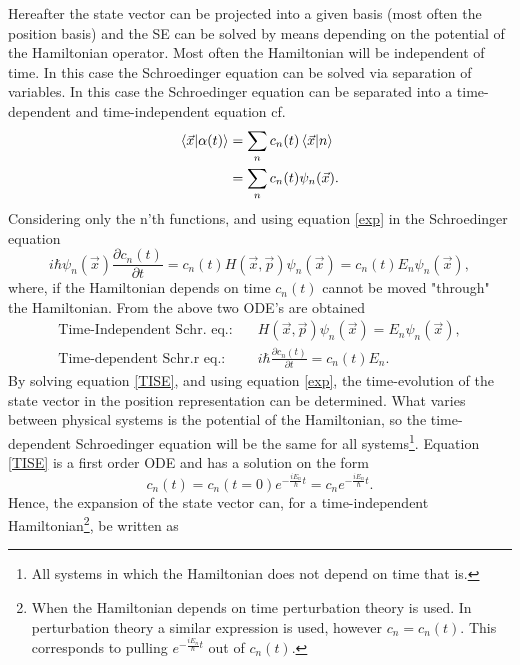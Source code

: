 Hereafter the state vector can be projected into a given basis (most often the position basis) and the SE can be solved by means depending on the potential of the Hamiltonian operator. Most often the Hamiltonian will be independent of time. In this case the Schroedinger equation can be solved via separation of variables. In this case the Schroedinger equation can be separated into a time-dependent and time-independent equation cf.
\begin{equation}
	\begin{split}
		\braket{\vec{x}|\alpha(t)}&=\sum_nc_n(t)\braket{\vec{x}|n}\\
		&=\sum_nc_n(t)\psi_n(\vec{x}).\\
	\end{split}
	\label{exp}
\end{equation} 
Considering only the n'th functions, and using equation \eqref{exp} in the Schroedinger equation
\begin{equation}
	i\hbar \psi_n(\vec{x})\frac{\partial c_n(t)}{\partial t}=c_n(t)H(\vec{x},\vec{p})\psi_n(\vec{x})=c_n(t)E_n\psi_n(\vec{x}),
\end{equation} 
where, if the Hamiltonian depends on time $c_n(t)$ cannot be moved "through" the Hamiltonian. From the above two ODE's are obtained
\begin{equation}
	\begin{split}
		\text{Time-Independent Schr. eq.:} \quad &H(\vec{x},\vec{p})\psi_n(\vec{x})=E_n\psi_n(\vec{x}),\\
		\text{Time-dependent Schr.r eq.:} \quad &i\hbar \frac{\partial c_n(t)}{\partial t}=c_n(t)E_n.
	\end{split}
	\label{TISE}
\end{equation}  
By solving equation \eqref{TISE}, and using equation \eqref{exp}, the time-evolution of the state vector in the position representation can be determined. What varies between physical systems is the potential of the Hamiltonian, so the time-dependent Schroedinger equation will be the same for all systems\footnote{All systems in which the Hamiltonian does not depend on time that is.}. Equation \eqref{TISE} is a first order ODE and has a solution on the form
\begin{equation}
	c_n(t)=c_n(t=0)e^{-\frac{iE_n}{\hbar}t}=c_ne^{-\frac{iE_n}{\hbar}t}.
\end{equation} 
Hence, the expansion of the state vector can, for a time-independent Hamiltonian\footnote{When the Hamiltonian depends on time perturbation theory is used. In perturbation theory a similar expression is used, however $c_n=c_n(t)$. This corresponds to pulling $e^{-\frac{iE_n}{\hbar}t}$ out of $c_n(t)$.}, be written as
